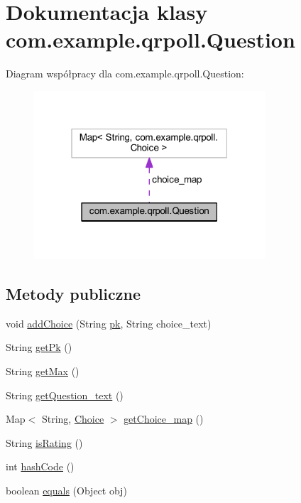 \hypertarget{classcom_1_1example_1_1qrpoll_1_1_question}{\section{Dokumentacja klasy com.\+example.\+qrpoll.\+Question}
\label{classcom_1_1example_1_1qrpoll_1_1_question}
}


Diagram współpracy dla com.\+example.\+qrpoll.\+Question\+:\nopagebreak
\begin{figure}[H]
\begin{center}
\leavevmode
\includegraphics[width=244pt]{classcom_1_1example_1_1qrpoll_1_1_question__coll__graph}
\end{center}
\end{figure}
\subsection*{Metody publiczne}
\begin{DoxyCompactItemize}
\item 
void \hyperlink{classcom_1_1example_1_1qrpoll_1_1_question_ab9e20bf997816ae32b9e3312f48d124f}{add\+Choice} (String \hyperlink{classcom_1_1example_1_1qrpoll_1_1_question_ab94e31e243d24239faf4ae4c68c28f0b}{pk}, String choice\+\_\+text)
\item 
String \hyperlink{classcom_1_1example_1_1qrpoll_1_1_question_a7b4c664c6c4ebec154ea7132c75bc88d}{get\+Pk} ()
\item 
String \hyperlink{classcom_1_1example_1_1qrpoll_1_1_question_a06182185a203fccb72e4421a10a8a511}{get\+Max} ()
\item 
String \hyperlink{classcom_1_1example_1_1qrpoll_1_1_question_ac79778f9afb3c040d0c6f4ada39fb34a}{get\+Question\+\_\+text} ()
\item 
Map$<$ String, \hyperlink{classcom_1_1example_1_1qrpoll_1_1_choice}{Choice} $>$ \hyperlink{classcom_1_1example_1_1qrpoll_1_1_question_a7ec19ad963a2fcaa76c29feb59129702}{get\+Choice\+\_\+map} ()
\item 
String \hyperlink{classcom_1_1example_1_1qrpoll_1_1_question_aa5e300a74cf22554ee7221da00aff666}{is\+Rating} ()
\item 
int \hyperlink{classcom_1_1example_1_1qrpoll_1_1_question_a3608f9d26af608c85ac88ee48e68f624}{hash\+Code} ()
\item 
boolean \hyperlink{classcom_1_1example_1_1qrpoll_1_1_question_a9aa72d6cf0140674837bd6f2399631ed}{equals} (Object obj)
\end{DoxyCompactItemize}
